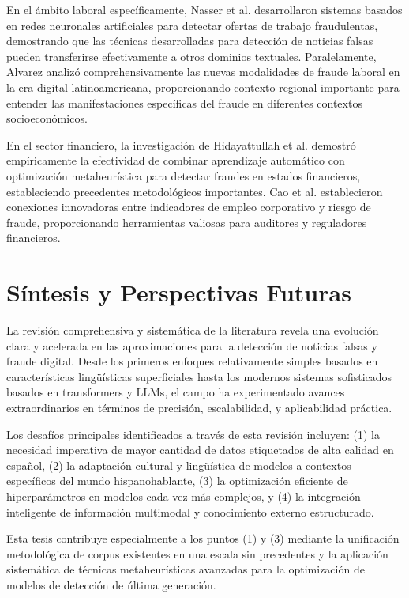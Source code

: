 En el ámbito laboral específicamente, Nasser et al. \cite{nasser2021online} desarrollaron sistemas basados en redes neuronales artificiales para detectar ofertas de trabajo fraudulentas, demostrando que las técnicas desarrolladas para detección de noticias falsas pueden transferirse efectivamente a otros dominios textuales. Paralelamente, Alvarez \cite{alvarez2021fraude} analizó comprehensivamente las nuevas modalidades de fraude laboral en la era digital latinoamericana, proporcionando contexto regional importante para entender las manifestaciones específicas del fraude en diferentes contextos socioeconómicos.

En el sector financiero, la investigación de Hidayattullah et al. \cite{hidayattullah2020financial} demostró empíricamente la efectividad de combinar aprendizaje automático con optimización metaheurística para detectar fraudes en estados financieros, estableciendo precedentes metodológicos importantes. Cao et al. \cite{cao2020corporate} establecieron conexiones innovadoras entre indicadores de empleo corporativo y riesgo de fraude, proporcionando herramientas valiosas para auditores y reguladores financieros.

\section{Síntesis y Perspectivas Futuras}
\label{sec:sintesis_perspectivas}

La revisión comprehensiva y sistemática de la literatura revela una evolución clara y acelerada en las aproximaciones para la detección de noticias falsas y fraude digital. Desde los primeros enfoques relativamente simples basados en características lingüísticas superficiales hasta los modernos sistemas sofisticados basados en transformers y LLMs, el campo ha experimentado avances extraordinarios en términos de precisión, escalabilidad, y aplicabilidad práctica.

Los desafíos principales identificados a través de esta revisión incluyen: (1) la necesidad imperativa de mayor cantidad de datos etiquetados de alta calidad en español, (2) la adaptación cultural y lingüística de modelos a contextos específicos del mundo hispanohablante, (3) la optimización eficiente de hiperparámetros en modelos cada vez más complejos, y (4) la integración inteligente de información multimodal y conocimiento externo estructurado.

Esta tesis contribuye especialmente a los puntos (1) y (3) mediante la unificación metodológica de corpus existentes en una escala sin precedentes y la aplicación sistemática de técnicas metaheurísticas avanzadas para la optimización de modelos de detección de última generación.

